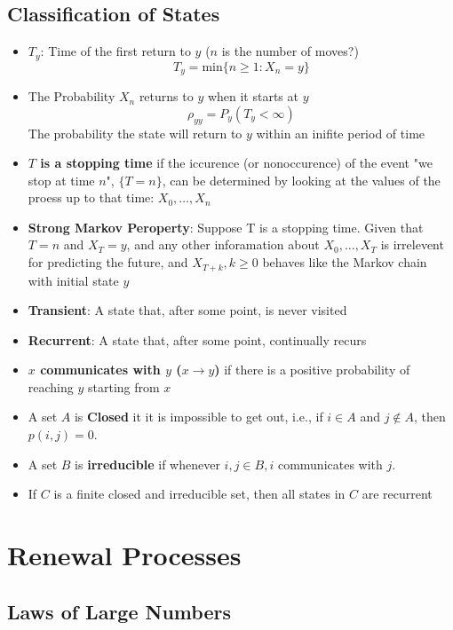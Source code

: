 \documentclass{report}
\begin{document}
\section{Classification of States}
  \begin{itemize}
    \item $T_y$: Time of the first return to $y$ ($n$ is the number of moves?)
      \[ T_y = \text{min}\{n \geq 1 : X_n = y\} \]
    \item The Probability $X_n$ returns to $y$ when it starts at $y$
      \[ \rho_{yy} = P_y(T_y < \infty) \]
      The probability the state will return to $y$ within an inifite period of time
      \item \textbf{$T$ is a stopping time} if the iccurence (or nonoccurence) 
        of the event "we stop at time $n$", $\{T = n\}$, can be determined
        by looking at the values of the proess up to that time: $X_0, \dots, X_n$

      \item \textbf{Strong Markov Peroperty}: Suppose T is a stopping time.
        Given that $T=n$ and $X_T = y$, and any other inforamation about
        $X_0,\dots,X_T$ is irrelevent for predicting the future, and $X_{T+k},
        k \geq 0$ behaves like the Markov chain with initial state $y$

      \item \textbf{Transient}: A state that, after some point, is never visited
      \item \textbf{Recurrent}: A state that, after some point, continually recurs
      \item \textbf{$x$ communicates with $y$ ($x \rightarrow y$)} if there is a
        positive probability of reaching $y$ starting from $x$
      \item  A set $A$ is  \textbf{Closed} it it is impossible to get out, 
        i.e., if $i \in A$ and $j \notin A$, then $p(i,j) = 0$.
      \item A set $B$ is \textbf{irreducible} if whenever $i, j \in B, i$
        communicates with $j$.
      \item If $C$ is a finite closed and irreducible set, then all states
        in $C$ are recurrent


  \end{itemize}

\chapter{Renewal Processes}
\section{Laws of Large Numbers}
\end{document}
